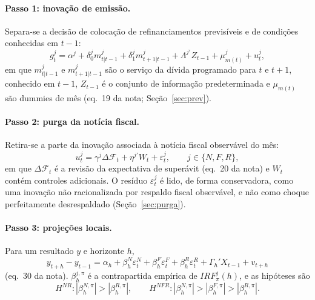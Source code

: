 \documentclass[12pt,a4paper]{article}
\begin{document}
\paragraph{Passo 1: inovação de emissão.} Separa-se a decisão de colocação de
refinanciamentos previsíveis e de condições conhecidas em \(t-1\):
\begin{equation}
g_t^j=\alpha^j+\delta_0^j m_{t|t-1}^j+\delta_1^j m_{t+1|t-1}^j
+\Lambda^{j\prime}Z_{t-1}+\mu_{m(t)}^j+u_t^j,
\label{eq:doc_forecast}
\end{equation}
em que \(m_{t|t-1}^j\) e \(m_{t+1|t-1}^j\) são o serviço da dívida programado para
\(t\) e \(t+1\), conhecido em \(t-1\), \(Z_{t-1}\) é o conjunto de informação
predeterminada e \(\mu_{m(t)}\) são dummies de mês (eq.~19 da nota;
Seção~\ref{sec:prev}).

\paragraph{Passo 2: purga da notícia fiscal.} Retira-se a parte da inovação
associada à notícia fiscal observável do mês:
\begin{equation}
u_t^j=\gamma^j\Delta\mathcal{F}_t+\eta^{j\prime}W_t+\varepsilon_t^j,
\qquad j\in\{N,F,R\},
\label{eq:doc_survey_purge}
\end{equation}
em que \(\Delta\mathcal{F}_t\) é a revisão da expectativa de superávit (eq.~20 da
nota) e \(W_t\) contém controles adicionais. O resíduo \(\varepsilon_t^j\) é lido,
de forma conservadora, como uma inovação não racionalizada por respaldo fiscal
observável, e não como choque perfeitamente desrespaldado (Seção~\ref{sec:purga}).

\paragraph{Passo 3: projeções locais.} Para um resultado \(y\) e horizonte \(h\),
\begin{equation}
y_{t+h}-y_{t-1}=\alpha_h+\beta_h^N\varepsilon_t^N
+\beta_h^F\varepsilon_t^F+\beta_h^R\varepsilon_t^R
+\Gamma_h'X_{t-1}+v_{t+h}
\label{eq:doc_local_projection}
\end{equation}
(eq.~30 da nota). \(\beta_h^{j,\pi}\) é a contrapartida empírica de
\(IRF_\pi^j(h)\), e as hipóteses são
\begin{equation}
H^{NR}: |\beta_h^{N,\pi}|>|\beta_h^{R,\pi}|,
\qquad
H^{NFR}: |\beta_h^{N,\pi}|>|\beta_h^{F,\pi}|>|\beta_h^{R,\pi}|.
\label{eq:doc_empirical_tests}
\end{equation}
\end{document}
